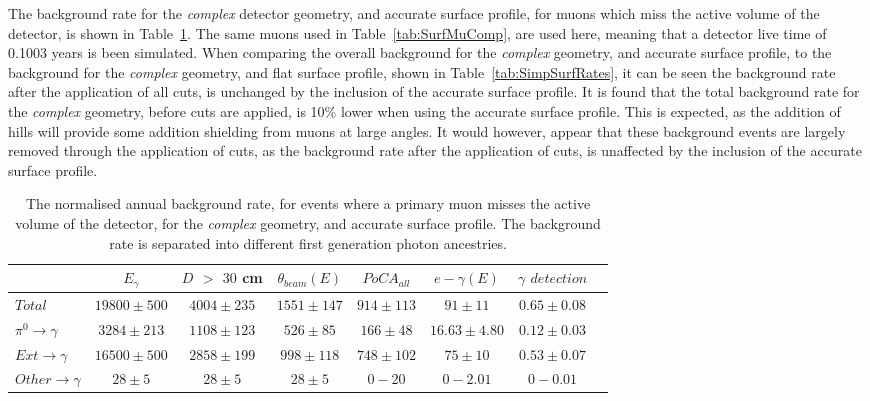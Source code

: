 The background rate for the \emph{complex} detector geometry, and accurate surface profile, for muons which miss the active volume of the detector, is shown in Table~\ref{tab:SurfMuMissComp}. The same muons used in Table~\ref{tab:SurfMuComp}, are used here, meaning that a detector live time of 0.1003 years is been simulated. When comparing the overall background for the \emph{complex} geometry, and accurate surface profile, to the background for the \emph{complex} geometry, and flat surface profile, shown in Table~\ref{tab:SimpSurfRates}, it can be seen the background rate after the application of all cuts, is unchanged by the inclusion of the accurate surface profile. It is found that the total background rate for the \emph{complex} geometry, before cuts are applied, is 10\% lower when using the accurate surface profile. This is expected, as the addition of hills will provide some addition shielding from muons at large angles. It would however, appear that these background events are largely removed through the application of cuts, as the background rate after the application of cuts, is unaffected by the inclusion of the accurate surface profile. \\

\begin{table}[h!]
  \caption[The normalised annual background rate, for events where a primary muon misses the active volume of the detector, for the \emph{complex} geometry, and accurate surface profile]
          {The normalised annual background rate, for events where a primary muon misses the active volume of the detector, for the \emph{complex} geometry, and accurate surface profile. The background rate is separated into different first generation photon ancestries.}
  \label{tab:SurfMuMissComp}
  \centering
  \scriptsize
  \begin{tabular}{l c c c c c c c }
    \toprule
        & $E_\gamma$ &  $D$ $>$ $30$ cm & $\theta_{beam}(E)$ & $PoCA_{all}$ & $e-\gamma(E)$ & $\gamma$ $detection$ \\
        \midrule
        $Total$          & $19800\pm500$ & $4004\pm235$ & $1551\pm147$ & $914\pm113$ & $91\pm11$      & $0.65\pm0.08$ \\

        $\pi^0\to\gamma$ & $3284\pm213$  & $1108\pm123$ & $526\pm85$   & $166\pm48$  & $16.63\pm4.80$ & $0.12\pm0.03$ \\

        $Ext\to\gamma$   & $16500\pm500$ & $2858\pm199$ & $998\pm118$  & $748\pm102$ & $75\pm10$      & $0.53\pm0.07$ \\

        $Other\to\gamma$ & $28\pm5$      & $28\pm5$     & $28\pm5$     & $0-20$      & $0-2.01$       & $0-0.01$ \\
        \bottomrule
  \end{tabular}
\end{table}


